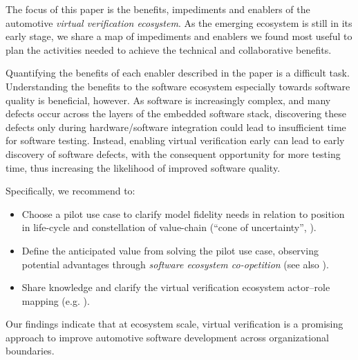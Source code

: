 The focus of this paper is the benefits, impediments and enablers of the automotive \emph{virtual verification ecosystem}.
As the emerging ecosystem is still in its early stage, we share a map of impediments and enablers we found most useful to plan the activities needed to achieve the technical and collaborative benefits.

Quantifying the benefits of each enabler described in the paper is a difficult task.
Understanding the benefits to the software ecosystem especially towards software quality %
is beneficial, however. 
As software is increasingly complex, and many defects occur across the layers of the embedded software stack, discovering these defects only during hardware/software integration could lead to %
insufficient time for software testing.
Instead, enabling %
virtual verification %
early %
can lead to early discovery of software defects, with the consequent opportunity for more testing time, thus increasing the likelihood of improved software quality.

Specifically, we recommend to:
\begin{itemize}
    \item Choose a pilot use case to clarify model fidelity needs in relation to position in life-cycle and constellation of value-chain (``cone of uncertainty'', \cite{Boehm1981}).
    \item Define the anticipated value from solving the pilot use case, observing potential advantages through \emph{software ecosystem co-opetition} (see also \cite{Agerfalk2008}).
    \item %
    {Share} knowledge and clarify %
    the {virtual verification ecosystem} actor--role mapping (e.g. \cite{kilamo2012proprietary}).
\end{itemize}

Our findings indicate that at ecosystem scale, virtual verification is a promising approach to improve automotive software development across organizational boundaries.





